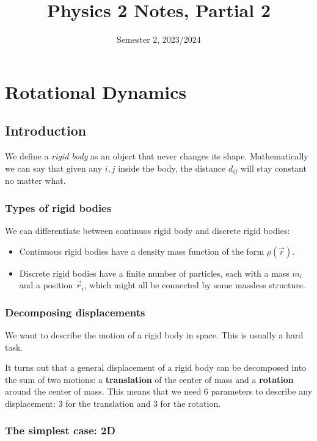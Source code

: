 \documentclass[14pt]{extarticle}
\title{Physics 2 Notes, Partial 2}
\date{Semester 2, 2023/2024}
\begin{document}
\maketitle
\tableofcontents
\clearpage

\section{Rotational Dynamics}

\subsection{Introduction}

We define a \emph{rigid body} as an object that never changes its shape.
Mathematically we can say that given any $i, j$ inside the body, the distance $d_{ij}$ will stay constant no matter what.

\subsubsection{Types of rigid bodies}

We can differentiate between continuos rigid body and discrete rigid bodies:
\begin{itemize}
    \item Continuous rigid bodies have a density mass function of the form $\rho(\vec{r})$.
    \item Discrete rigid bodies have a finite number of particles, each with a mass $m_i$ and a position $\vec{r}_i$, which might all be connected by some massless structure.
\end{itemize}

\subsubsection{Decomposing displacements}

We want to describe the motion of a rigid body in space. This is usually a hard task.

It turns out that a general displacement of a rigid body can be decomposed into the sum of two motions: a \textbf{translation} of the center of mass and a \textbf{rotation} around the center of mass.
This means that we need 6 parameters to describe any displacement: 3 for the translation and 3 for the rotation.

\subsubsection{The simplest case: 2D}
\end{document}
